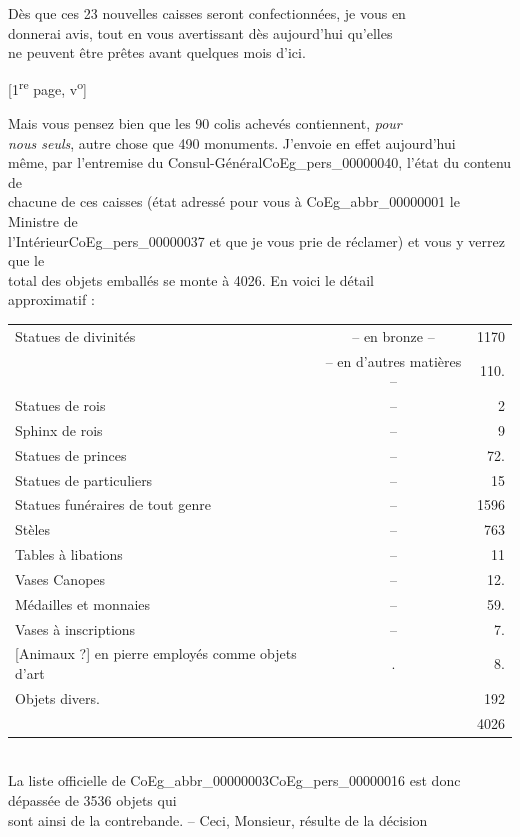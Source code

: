 \documentclass{book}
\begin{document}
Dès que ces 23 nouvelles caisses seront confectionnées, je vous en\\
donnerai avis, tout en vous avertissant dès aujourd’hui qu’elles\\
ne peuvent être prêtes avant quelques mois d’ici.
{\footnotesize\begin{center} {[1\textsuperscript{re} page, v\textsuperscript{o}]}\end{center}}
\indent Mais vous pensez bien que les 90 colis achevés contiennent, \textit{pour\\
nous seuls}, autre chose que 490 monuments. J’envoie en effet aujourd’hui\\
même, par l’entremise du Consul-Général\gls{CoEg_pers_00000040}, l’état du contenu de\\
chacune de ces caisses (état adressé pour vous à \gls{CoEg_abbr_00000001} le Ministre de\\
l’Intérieur\gls{CoEg_pers_00000037} et que je vous prie de réclamer) et vous y verrez que le\\
total des objets emballés se monte à 4026. En voici le détail\\
approximatif :\\
\begin{tabular}{ l c r }
  Statues de divinités & – en bronze	– & 1170 \\
 & – en d’autres matières 	– &	110.\\
  Statues de rois	&	–	&	2\\
Sphinx de rois	&	–	&	9\\
Statues de princes	& –	&	72.\\
Statues de particuliers	& – & 15\\
Statues funéraires de tout genre &	–	&	1596\\
Stèles	&	–	&	763\\
Tables à libations	& – &	11\\
Vases Canopes	&	–	&	12.\\
Médailles et monnaies	& –	&	59.\\
Vases à inscriptions	& –	&	7.\\
{[Animaux ?]} en pierre employés comme objets d’art &.&8.\\
Objets divers.&& 192\\
&&4026
\end{tabular}\\
\indent La liste officielle de \gls{CoEg_abbr_00000003}\gls{CoEg_pers_00000016} est donc dépassée de 3536 objets qui\\
sont ainsi de la contrebande. – Ceci, Monsieur, résulte de la décision\\
\end{document}
